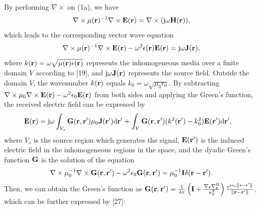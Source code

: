\documentclass[a4paper,12pt]{article}
\begin{document}
\begin{framed}
{\color{red}
	\quad By performing $\nabla\times$ on (1a), we have
	\begin{equation}
		\nabla \times \mu({\bf r})^{-1} \nabla \times {\bf E}({\bf r}) = \nabla \times ({\rm j}\omega{\bf H}({\bf r})),
	\end{equation}
	 which leads to the corresponding vector wave equation
	 \begin{equation}
	 	\nabla \times \mu({\bf r})^{-1} \nabla \times {\bf E}({\bf r}) - \omega^2 \epsilon({\bf r})  {\bf E}({\bf r}) = {\rm j}\omega {\bf J}({\bf r}),
	 \end{equation}
	 where $k({\bf r}) = \omega \sqrt{\mu({\bf r})\epsilon({\bf r})}$ represents the inhomogeneous media over a finite domain $V$ according to [19], and ${\rm j}\omega {\bf J}({\bf r})$ represents the source field. Outside the domain $V$, the wavenumber $k({\bf r})$ equals $k_0 = \omega\sqrt{\mu_0\epsilon_0}$.
	 By subtracting $\nabla \times \mu_0 \nabla  \times {\bf E}({\bf r})- \omega^2 \epsilon_0 {\bf E}({\bf r})$ from both sides and applying the Green's function, the received electric field can be expressed by
\begin{equation}
	\begin{aligned} 
		{\bf E}({\bf r}) &= {\rm j}\omega\int_{V_s} {\bf G}({\bf r},{\bf r}')\mu_0{\bf J}({\bf r}'){\rm d}{\bf r}' 
		+ \int_{V} {\bf G}({\bf r},{\bf r}')(k^2({\bf r}')-k_0^2) 
		{\bf E}({\bf r}'){\rm d}{\bf r}',
	\end{aligned}
	\label{equ_scattering_field}
\end{equation}
where $V_s$ is the source region which generates the signal, ${\bf E}({\bf r}')$ is the induced electric field in the inhomogeneous regions in the space, and the dyadic Green's function ${\bf G}$ is the solution of the equation
\begin{equation}
	\begin{aligned} 
		\nabla \times \mu_0^{-1} \nabla \times {\bf G}({\bf r},{\bf r}') - \omega^2 \epsilon_0  {\bf G}({\bf r},{\bf r}') = \mu_0^{-1} {\bf I} \delta({\bf r}-{\bf r}').
	\end{aligned}
\end{equation}
Then, we can obtain the Green's function as ${\bf G}({\bf r},{\bf r}') = \frac{1}{{4\pi }} \left( {{\bf{I}} + \frac{{{\nabla _{\bf{r}}}\nabla _{\bf{r}}^{\rm{H}}}}{{{\kappa_0 ^2}}}} \right) \frac{{{e^{{\rm{j}}\kappa_0 \left\| {{\bf{r}} - {\bf{r}'}} \right\|}}}}{{\left\| {{\bf{r}} - {\bf{r}'}} \right\|}} $, which can be further expressed by [27]:
\begin{equation}

\end{equation}}
\end{framed}
\end{document}
